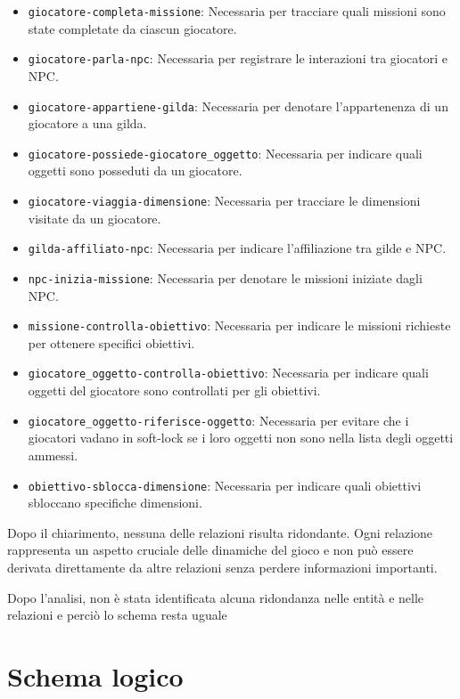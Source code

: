 \documentclass{article}
\begin{document}
\begin{itemize}
    \item \lstinline|giocatore-completa-missione|: Necessaria per tracciare quali missioni sono state completate da ciascun giocatore.
    \item \lstinline|giocatore-parla-npc|: Necessaria per registrare le interazioni tra giocatori e NPC.
    \item \lstinline|giocatore-appartiene-gilda|: Necessaria per denotare l'appartenenza di un giocatore a una gilda.
    \item \lstinline|giocatore-possiede-giocatore_oggetto|: Necessaria per indicare quali oggetti sono posseduti da un giocatore.
    \item \lstinline|giocatore-viaggia-dimensione|: Necessaria per tracciare le dimensioni visitate da un giocatore.
    \item \lstinline|gilda-affiliato-npc|: Necessaria per indicare l'affiliazione tra gilde e NPC.
    \item \lstinline|npc-inizia-missione|: Necessaria per denotare le missioni iniziate dagli NPC.
    \item \lstinline|missione-controlla-obiettivo|: Necessaria per indicare le missioni richieste per ottenere specifici obiettivi.
    \item \lstinline|giocatore_oggetto-controlla-obiettivo|: Necessaria per indicare quali oggetti del giocatore sono controllati per gli obiettivi.
    \item \lstinline|giocatore_oggetto-riferisce-oggetto|: Necessaria per evitare che i giocatori vadano in soft-lock se i loro oggetti non sono nella lista degli oggetti ammessi.
    \item \lstinline|obiettivo-sblocca-dimensione|: Necessaria per indicare quali obiettivi sbloccano specifiche dimensioni.
\end{itemize}

Dopo il chiarimento, nessuna delle relazioni risulta ridondante. Ogni relazione rappresenta un aspetto cruciale delle dinamiche del gioco e non può essere derivata direttamente da altre relazioni senza perdere informazioni importanti.

Dopo l'analisi, non è stata identificata alcuna ridondanza nelle entità e nelle relazioni e perciò lo schema resta uguale

\section{Schema logico}
\end{document}

